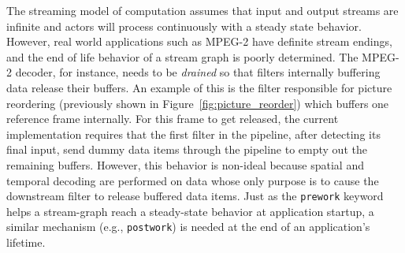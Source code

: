 The streaming model of computation assumes that input and output streams are infinite 
and actors will process continuously with a steady state behavior. However, real 
world applications such as MPEG-2 have definite stream endings, and the end of life 
behavior of a stream graph is poorly determined. The MPEG-2 decoder, for instance, 
needs to be \textit{drained} so that filters internally buffering data release their 
buffers. An example of this is the filter responsible for picture reordering 
(previously shown in Figure~\ref{fig:picture_reorder}) which buffers one reference frame 
internally. For this frame to get released, the current implementation requires that 
the first filter in the pipeline, after detecting its final input, send dummy data 
items through the pipeline to empty out the remaining buffers. However, this behavior 
is non-ideal because spatial and temporal decoding are performed on data whose only 
purpose is to cause the downstream filter to release buffered data items. Just as 
the \texttt{prework} keyword helps a stream-graph reach a steady-state behavior at 
application startup, a similar mechanism (e.g., \texttt{postwork}) is needed at the 
end of an application's lifetime.